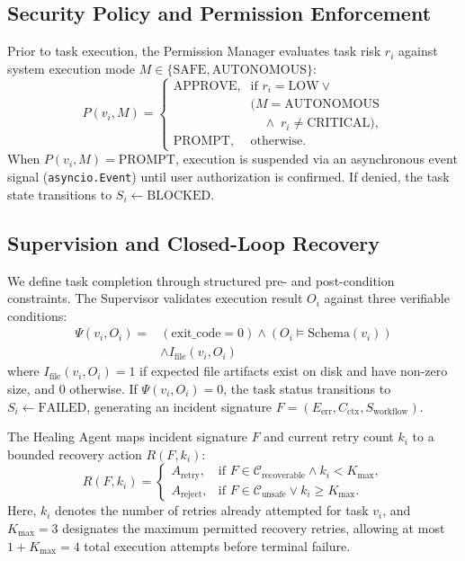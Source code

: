 \documentclass[conference]{IEEEtran}
\begin{document}
\subsection{Security Policy and Permission Enforcement}
Prior to task execution, the Permission Manager evaluates task risk $r_i$ against system execution mode $M \in \{\text{SAFE}, \text{AUTONOMOUS}\}$:
\begin{equation}
P(v_i, M) =
\begin{cases}
\text{APPROVE}, & \text{if } r_i = \text{LOW} \lor {} \\
                & (M = \text{AUTONOMOUS} \\
                & \quad \land \; r_i \ne \text{CRITICAL}), \\
\text{PROMPT},  & \text{otherwise}.
\end{cases}
\end{equation}
When $P(v_i, M) = \text{PROMPT}$, execution is suspended via an asynchronous event signal (\texttt{asyncio.Event}) until user authorization is confirmed. If denied, the task state transitions to $S_i \leftarrow \text{BLOCKED}$.

\subsection{Supervision and Closed-Loop Recovery}
We define task completion through structured pre- and post-condition constraints. The Supervisor validates execution result $O_i$ against three verifiable conditions:
\begin{equation}
\begin{aligned}
\Psi(v_i, O_i) = {} & (\text{exit\_code} = 0) \land (O_i \models \text{Schema}(v_i)) \\
                    & \land I_{\text{file}}(v_i, O_i)
\end{aligned}
\end{equation}
where $I_{\text{file}}(v_i, O_i) = 1$ if expected file artifacts exist on disk and have non-zero size, and $0$ otherwise. If $\Psi(v_i, O_i) = 0$, the task status transitions to $S_i \leftarrow \text{FAILED}$, generating an incident signature $F = (E_{\text{err}}, C_{\text{ctx}}, S_{\text{workflow}})$.

The Healing Agent maps incident signature $F$ and current retry count $k_i$ to a bounded recovery action $R(F, k_i)$:
\begin{equation}
R(F, k_i) =
\begin{cases}
A_{\text{retry}}, & \text{if } F \in \mathcal{C}_{\text{recoverable}} \land k_i < K_{\text{max}}, \\
A_{\text{reject}}, & \text{if } F \in \mathcal{C}_{\text{unsafe}} \lor k_i \ge K_{\text{max}}.
\end{cases}
\end{equation}
Here, $k_i$ denotes the number of retries already attempted for task $v_i$, and $K_{\text{max}} = 3$ designates the maximum permitted recovery retries, allowing at most $1 + K_{\text{max}} = 4$ total execution attempts before terminal failure.
\end{document}
